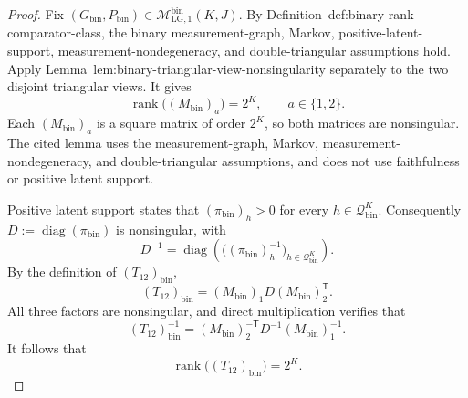 \documentclass{article}
\begin{document}
\begin{proof}
Fix \((G_{\mathrm{bin}},P_{\mathrm{bin}})\in
\mathcal M_{\mathrm{LG},1}^{\mathrm{bin}}(K,J)\).  By
Definition~\textnormal{def:binary-rank-comparator-class}, the binary
measurement-graph, Markov, positive-latent-support,
measurement-nondegeneracy, and double-triangular assumptions hold.  Apply
Lemma~\textnormal{lem:binary-triangular-view-nonsingularity} separately to
the two disjoint triangular views.  It gives
\[
 \operatorname{rank}\bigl((M_{\mathrm{bin}})_a\bigr)=2^K,
 \qquad a\in\{1,2\}.
\]
Each \((M_{\mathrm{bin}})_a\) is a square matrix of order \(2^K\), so both
matrices are nonsingular.  The cited lemma uses the measurement-graph,
Markov, measurement-nondegeneracy, and double-triangular assumptions, and
does not use faithfulness or positive latent support.

Positive latent support states that
\((\pi_{\mathrm{bin}})_h>0\) for every
\(h\in\mathcal Q_{\mathrm{bin}}^K\).  Consequently
\(D:=\operatorname{diag}(\pi_{\mathrm{bin}})\) is nonsingular, with
\[
 D^{-1}=\operatorname{diag}
 \left(\bigl((\pi_{\mathrm{bin}})_h^{-1}\bigr)_
 {h\in\mathcal Q_{\mathrm{bin}}^K}\right).
\]
By the definition of \((T_{12})_{\mathrm{bin}}\),
\[
 (T_{12})_{\mathrm{bin}}
 =(M_{\mathrm{bin}})_1D(M_{\mathrm{bin}})_2^{\mathsf T}.
\]
All three factors are nonsingular, and direct multiplication verifies that
\[
 (T_{12})_{\mathrm{bin}}^{-1}
 =(M_{\mathrm{bin}})_2^{-\mathsf T}D^{-1}
  (M_{\mathrm{bin}})_1^{-1}.
\]
It follows that
\[
 \operatorname{rank}\bigl((T_{12})_{\mathrm{bin}}\bigr)=2^K.
\]


\end{proof}
\end{document}
